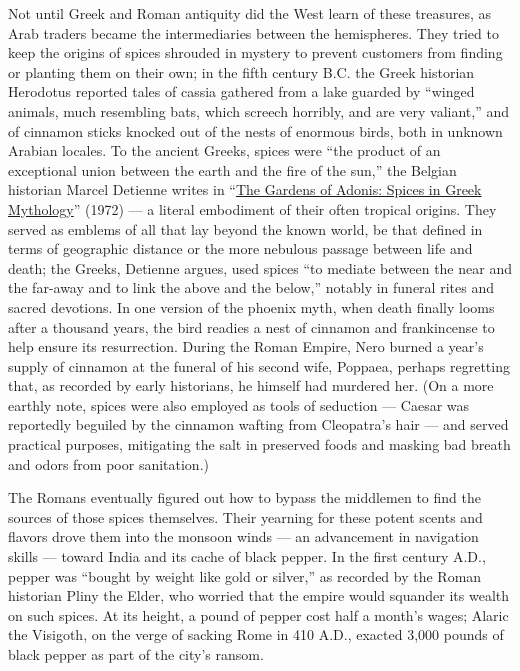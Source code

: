 Not until Greek and Roman antiquity did the West learn of these
treasures, as Arab traders became the intermediaries between the
hemispheres. They tried to keep the origins of spices shrouded in
mystery to prevent customers from finding or planting them on their own;
in the fifth century B.C. the Greek historian Herodotus reported tales
of cassia gathered from a lake guarded by ``winged animals, much
resembling bats, which screech horribly, and are very valiant,'' and of
cinnamon sticks knocked out of the nests of enormous birds, both in
unknown Arabian locales. To the ancient Greeks, spices were ``the
product of an exceptional union between the earth and the fire of the
sun,'' the Belgian historian Marcel Detienne writes in
``\href{https://press.princeton.edu/books/paperback/9780691001043/the-gardens-of-adonis}{The
Gardens of Adonis: Spices in Greek Mythology}'' (1972) --- a literal
embodiment of their often tropical origins. They served as emblems of
all that lay beyond the known world, be that defined in terms of
geographic distance or the more nebulous passage between life and death;
the Greeks, Detienne argues, used spices ``to mediate between the near
and the far-away and to link the above and the below,'' notably in
funeral rites and sacred devotions. In one version of the phoenix myth,
when death finally looms after a thousand years, the bird readies a nest
of cinnamon and frankincense to help ensure its resurrection. During the
Roman Empire, Nero burned a year's supply of cinnamon at the funeral of
his second wife, Poppaea, perhaps regretting that, as recorded by early
historians, he himself had murdered her. (On a more earthly note, spices
were also employed as tools of seduction --- Caesar was reportedly
beguiled by the cinnamon wafting from Cleopatra's hair --- and served
practical purposes, mitigating the salt in preserved foods and masking
bad breath and odors from poor sanitation.)

The Romans eventually figured out how to bypass the middlemen to find
the sources of those spices themselves. Their yearning for these potent
scents and flavors drove them into the monsoon winds --- an advancement
in navigation skills --- toward India and its cache of black pepper. In
the first century A.D., pepper was ``bought by weight like gold or
silver,'' as recorded by the Roman historian Pliny the Elder, who
worried that the empire would squander its wealth on such spices. At its
height, a pound of pepper cost half a month's wages; Alaric the
Visigoth, on the verge of sacking Rome in 410 A.D., exacted 3,000 pounds
of black pepper as part of the city's ransom.


